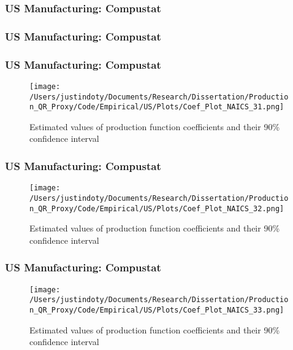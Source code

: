 \documentclass{beamer}
\begin{document}

\begin{frame}
\frametitle{US Manufacturing: Compustat}
\scriptsize

\end{frame}

\begin{frame}
\frametitle{US Manufacturing: Compustat}
\scriptsize

\end{frame}

\begin{frame}
\frametitle{US Manufacturing: Compustat}
\begin{figure}[ht]
\centering
\texttt{[image: /Users/justindoty/Documents/Research/Dissertation/Production\_QR\_Proxy/Code/Empirical/US/Plots/Coef\_Plot\_NAICS\_31.png]}
\caption{Estimated values of production function coefficients and their 90\% confidence interval}
\end{figure}
\end{frame}

\begin{frame}
\frametitle{US Manufacturing: Compustat}
\begin{figure}[ht]
\centering
\texttt{[image: /Users/justindoty/Documents/Research/Dissertation/Production\_QR\_Proxy/Code/Empirical/US/Plots/Coef\_Plot\_NAICS\_32.png]}
\caption{Estimated values of production function coefficients and their 90\% confidence interval}
\end{figure}
\end{frame}

\begin{frame}
\frametitle{US Manufacturing: Compustat}
\begin{figure}[ht]
\centering
\texttt{[image: /Users/justindoty/Documents/Research/Dissertation/Production\_QR\_Proxy/Code/Empirical/US/Plots/Coef\_Plot\_NAICS\_33.png]}
\caption{Estimated values of production function coefficients and their 90\% confidence interval}
\end{figure}
\end{frame}
\end{document}
